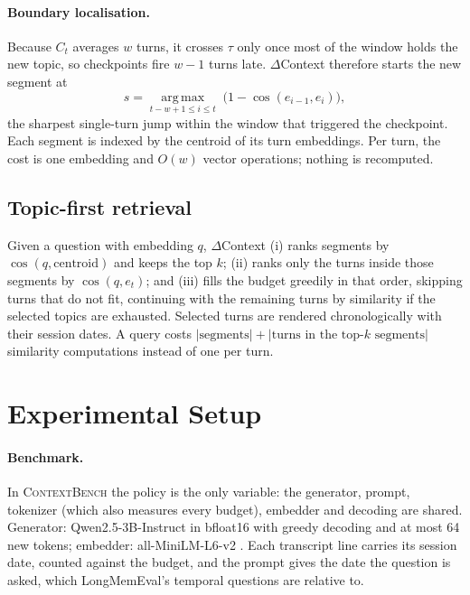 \documentclass[11pt]{article}
\newcommand{\dc}{$\Delta$Context}
\begin{document}
\paragraph{Boundary localisation.} Because $C_t$ averages $w$ turns, it
crosses $\tau$ only once most of the window holds the new topic, so
checkpoints fire $w - 1$ turns late. \dc{} therefore starts the new segment at
\begin{equation}
  s = \operatorname*{arg\,max}_{t-w+1 \le i \le t}\; \bigl(1 - \cos(e_{i-1}, e_i)\bigr),
\end{equation}
the sharpest single-turn jump within the window that triggered the checkpoint.
Each segment is indexed by the centroid of its turn embeddings. Per turn, the
cost is one embedding and $O(w)$ vector operations; nothing is recomputed.

\subsection{Topic-first retrieval}
Given a question with embedding $q$, \dc{} (i) ranks segments by
$\cos(q, \text{centroid})$ and keeps the top $k$; (ii) ranks only the turns
inside those segments by $\cos(q, e_t)$; and (iii) fills the budget greedily
in that order, skipping turns that do not fit, continuing with the remaining
turns by similarity if the selected topics are exhausted. Selected turns are
rendered chronologically with their session dates. A query costs
$|\text{segments}| + |\text{turns in the top-}k\text{ segments}|$ similarity
computations instead of one per turn.

\section{Experimental Setup}
\label{sec:setup}

\paragraph{Benchmark.} In \textsc{ContextBench} the policy is the only
variable: the generator, prompt, tokenizer (which also measures every budget),
embedder and decoding are shared. Generator: Qwen2.5-3B-Instruct
\citep{qwen2024qwen25} in bfloat16 with greedy decoding and at most 64 new
tokens; embedder: all-MiniLM-L6-v2 \citep{wang2020minilm,reimers2019sbert}.
Each transcript line carries its session date, counted against the budget, and
the prompt gives the date the question is asked, which LongMemEval's temporal
questions are relative to.
\end{document}
